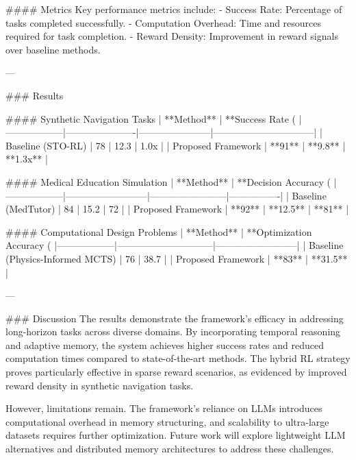 #### Metrics  
Key performance metrics include:  
- Success Rate: Percentage of tasks completed successfully.  
- Computation Overhead: Time and resources required for task completion.  
- Reward Density: Improvement in reward signals over baseline methods.

---

### Results  

#### Synthetic Navigation Tasks  
| **Method**      | **Success Rate (%
|------------------|----------------------|-----------------------|--------------------------------|  
| Baseline (STO-RL) | 78                  | 12.3                  | 1.0x                           |  
| Proposed Framework | **91**              | **9.8**               | **1.3x**                       |  

#### Medical Education Simulation  
| **Method**      | **Decision Accuracy (%
|------------------|--------------------------|------------------------|----------------|  
| Baseline (MedTutor) | 84                     | 15.2                   | 72             |  
| Proposed Framework | **92**                  | **12.5**               | **81**         |  

#### Computational Design Problems  
| **Method**      | **Optimization Accuracy (%
|------------------|------------------------------|--------------------------|  
| Baseline (Physics-Informed MCTS) | 76                     | 38.7                     |  
| Proposed Framework | **83**                      | **31.5**                  |  

---

### Discussion  
The results demonstrate the framework's efficacy in addressing long-horizon tasks across diverse domains. By incorporating temporal reasoning and adaptive memory, the system achieves higher success rates and reduced computation times compared to state-of-the-art methods. The hybrid RL strategy proves particularly effective in sparse reward scenarios, as evidenced by improved reward density in synthetic navigation tasks.

However, limitations remain. The framework's reliance on LLMs introduces computational overhead in memory structuring, and scalability to ultra-large datasets requires further optimization. Future work will explore lightweight LLM alternatives and distributed memory architectures to address these challenges.

